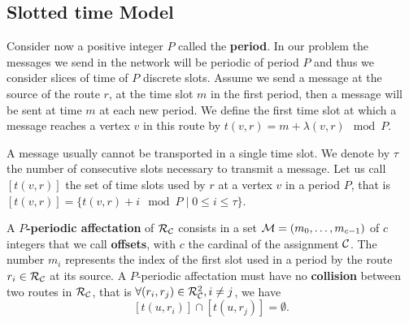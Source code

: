 \documentclass[a4paper,10pt]{article}
\begin{document}
   \subsection{Slotted time Model}
      Consider now a positive integer $P$ called the {\bf period}. In our problem the messages we send in the network will be periodic of period $P$ and thus we consider slices of time of $P$ discrete slots. Assume we send a message at the source of the route $r$,
      at the time slot $m$ in the first period, then a message will be sent at time $m$ at each new period. We define the first time slot at which a message reaches a vertex $v$ in this route by $t(v,r) = m + \lambda(v,r) \mod P$. 

      A message usually cannot be transported in a single time slot. We denote by $\tau$ the number 
      of consecutive slots necessary to transmit a message. Let us call $[t(v,r)]$ the set of time slots used by $r$ at a vertex $v$ in a period $P$, that is $[t(v,r)] = \{t(v,r) + i \mod P \mid 0 \leq i \leq \tau \}$.
      
      
      A {\bf $P$-periodic affectation} of $\cal R_{\cal C}$ consists in a set  ${\cal M}=(m_0, \ldots ,m_{c-1})$ of $c$ integers that we call {\bf offsets}, with $c$ the cardinal of the assignment $\cal C$. The number $m_i$ represents the index of the first slot used in a period  by the route $r_i \in {\cal R}_{\cal C}$ at its source.
      A $P$-periodic affectation must have no {\bf collision} between two routes in ${\cal R}_{\cal C}$, that is $\forall (r_i, r_j) \in {\cal R}_{\cal C}^2, i \neq j$, %
      we have $$[t(u,r_i)] \cap [t(u,r_j)] = \emptyset .$$
      
\end{document}
